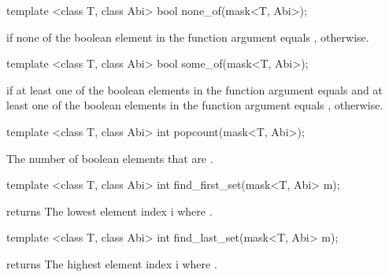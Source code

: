 \begin{itemdecl}
template <class T, class Abi> bool none_of(mask<T, Abi>);
\end{itemdecl}
\begin{itemdescr}
  \pnum\returns \true if none of the boolean element in the function argument equals \true, \false otherwise.
\end{itemdescr}

\begin{itemdecl}
template <class T, class Abi> bool some_of(mask<T, Abi>);
\end{itemdecl}
\begin{itemdescr}
  \pnum\returns \true if at least one of the boolean elements in the function argument equals \true and at least one of the boolean elements in the function argument equals \false, \false otherwise.
\end{itemdescr}

\begin{itemdecl}
template <class T, class Abi> int popcount(mask<T, Abi>);
\end{itemdecl}
\begin{itemdescr}
  \pnum\returns The number of boolean elements that are \true.
\end{itemdescr}

\begin{itemdecl}
template <class T, class Abi> int find_first_set(mask<T, Abi> m);
\end{itemdecl}
\begin{itemdescr}
  \pnum\requires {} returns \true
  \pnum\returns The lowest element index \code i where .
\end{itemdescr}

\begin{itemdecl}
template <class T, class Abi> int find_last_set(mask<T, Abi> m);
\end{itemdecl}
\begin{itemdescr}
  \pnum\requires {} returns \true
  \pnum\returns The highest element index \code i where .
\end{itemdescr}

